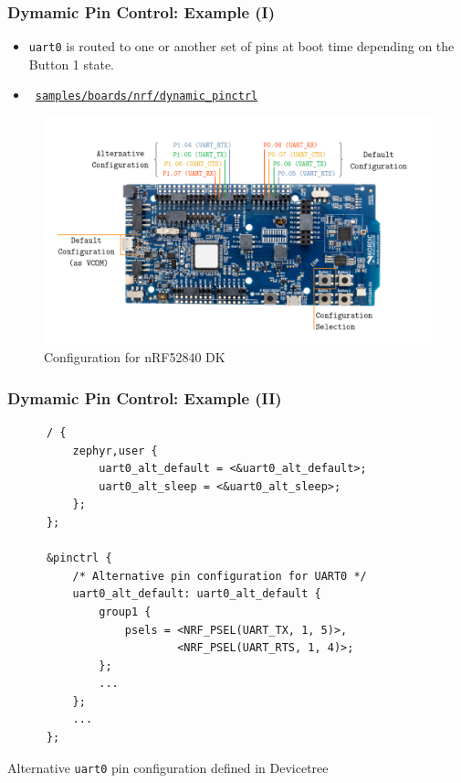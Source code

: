 \documentclass[handout]{beamer}
\begin{document}
\begin{frame}
  \frametitle{Dymamic Pin Control: Example (I)}

  \begin{itemize}
    \item<1-> \texttt{uart0} is routed to one or another set of pins at boot
          time depending on the Button 1 state.
    \item<2-> \faGithub~\href{https://github.com/zephyrproject-rtos/zephyr/tree/main/samples/boards/nrf/dynamic_pinctrl}{\texttt{samples/boards/nrf/dynamic\_pinctrl}}
  \end{itemize}

  \begin{figure}
    \centering
    \includegraphics[scale=0.2]{nrf52840dk-dynamic-pinctrl.png}
    \caption{Configuration for nRF52840 DK}
  \end{figure}
\end{frame}

\begin{frame}[fragile]
  \frametitle{Dymamic Pin Control: Example (II)}

  \begin{listing}[H]
    \begin{verbatim}
      / {
          zephyr,user {
              uart0_alt_default = <&uart0_alt_default>;
              uart0_alt_sleep = <&uart0_alt_sleep>;
          };
      };

      &pinctrl {
          /* Alternative pin configuration for UART0 */
          uart0_alt_default: uart0_alt_default {
              group1 {
                  psels = <NRF_PSEL(UART_TX, 1, 5)>,
                          <NRF_PSEL(UART_RTS, 1, 4)>;
              };
              ...
          };
          ...
      };
    \end{verbatim}
    \caption{Alternative \texttt{uart0} pin configuration defined in Devicetree}
  \end{listing}
\end{frame}
\end{document}
